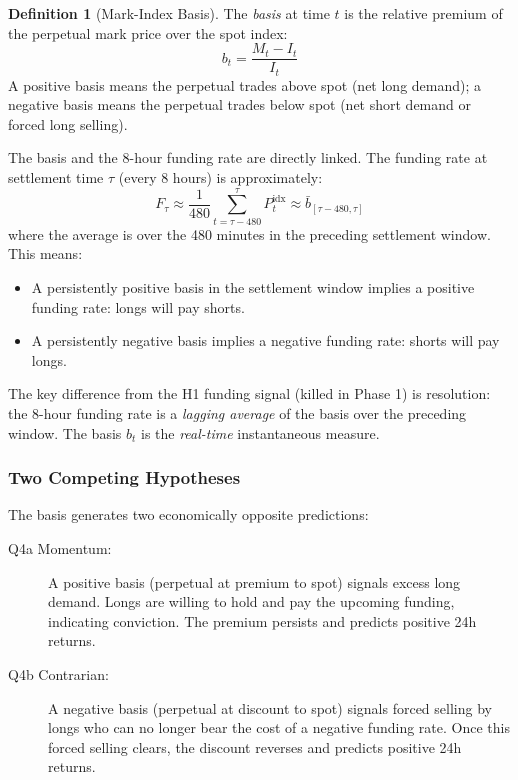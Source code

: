 \documentclass[12pt, a4paper]{article}
\theoremstyle{plain}
\theoremstyle{definition}
\newtheorem{definition}{Definition}[section]
\begin{document}
\begin{definition}[Mark-Index Basis]
  The \emph{basis} at time $t$ is the relative premium of the perpetual
  mark price over the spot index:
  \begin{equation}
    b_t = \frac{M_t - I_t}{I_t}
    \label{eq:basis}
  \end{equation}
  A positive basis means the perpetual trades above spot (net long
  demand); a negative basis means the perpetual trades below spot
  (net short demand or forced long selling).
\end{definition}

The basis and the 8-hour funding rate are directly linked.  The funding
rate at settlement time $\tau$ (every 8 hours) is approximately:
\begin{equation}
  F_\tau \approx \frac{1}{480}\sum_{t=\tau-480}^{\tau} P_t^{\text{idx}}
               \approx \bar{b}_{[\tau-480,\tau]}
\end{equation}
where the average is over the 480 minutes in the preceding settlement
window.  This means:

\begin{itemize}
  \item A persistently positive basis in the settlement window implies
        a positive funding rate: longs will pay shorts.
  \item A persistently negative basis implies a negative funding rate:
        shorts will pay longs.
\end{itemize}

The key difference from the H1 funding signal (killed in Phase 1) is
resolution: the 8-hour funding rate is a \emph{lagging average} of the
basis over the preceding window.  The basis $b_t$ is the \emph{real-time}
instantaneous measure.

\subsubsection{Two Competing Hypotheses}

The basis generates two economically opposite predictions:

\begin{description}
  \item[Q4a Momentum:] A positive basis (perpetual at premium to spot)
        signals excess long demand.  Longs are willing to hold and pay the
        upcoming funding, indicating conviction.  The premium persists and
        predicts positive 24h returns.

  \item[Q4b Contrarian:] A negative basis (perpetual at discount to spot)
        signals forced selling by longs who can no longer bear the cost of
        a negative funding rate.  Once this forced selling clears, the
        discount reverses and predicts positive 24h returns.
\end{description}
\end{document}

